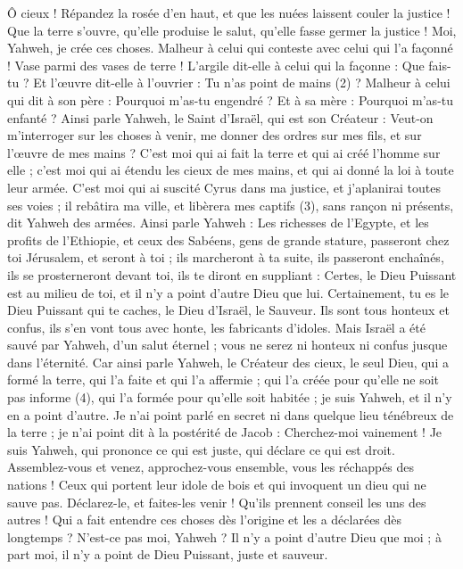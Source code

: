 \begin{multicols}{2}
Ô cieux ! Répandez la rosée d'en haut, et que les nuées laissent couler la justice ! Que la terre s'ouvre, qu'elle produise le salut, qu’elle fasse germer la justice ! Moi, Yahweh, je crée ces choses.
Malheur à celui qui conteste avec celui qui l’a façonné ! Vase parmi des vases de terre ! L'argile dit-elle à celui qui la façonne : Que fais-tu ? Et l’œuvre dit-elle à l’ouvrier : Tu n'as point de mains (2) ?
Malheur à celui qui dit à son père : Pourquoi m’as-tu engendré ? Et à sa mère : Pourquoi m’as-tu enfanté ?
Ainsi parle Yahweh, le Saint d'Israël, qui est son Créateur : Veut-on m’interroger sur les choses à venir, me donner des ordres sur mes fils, et sur l’œuvre de mes mains ?
C'est moi qui ai fait la terre et qui ai créé l'homme sur elle ; c'est moi qui ai étendu les cieux de mes mains, et qui ai donné la loi à toute leur armée.
C'est moi qui ai suscité Cyrus dans ma justice, et j’aplanirai toutes ses voies ; il rebâtira ma ville, et libèrera mes captifs (3), sans rançon ni présents, dit Yahweh des armées.
Ainsi parle Yahweh : Les richesses de l'Egypte, et les profits de l’Ethiopie, et ceux des Sabéens, gens de grande stature, passeront chez toi Jérusalem, et seront à toi ; ils marcheront à ta suite, ils passeront enchaînés, ils se prosterneront devant toi, ils te diront en suppliant : Certes, le Dieu Puissant est au milieu de toi, et il n'y a point d'autre Dieu que lui.
Certainement, tu es le Dieu Puissant qui te caches, le Dieu d'Israël, le Sauveur.
Ils sont tous honteux et confus, ils s’en vont tous avec honte, les fabricants d’idoles.
Mais Israël a été sauvé par Yahweh, d'un salut éternel ; vous ne serez ni honteux ni confus jusque dans l’éternité.
Car ainsi parle Yahweh, le Créateur des cieux, le seul Dieu, qui a formé la terre, qui l'a faite et qui l'a affermie ; qui l’a créée pour qu’elle ne soit pas informe (4), qui l’a formée pour qu’elle soit habitée ; je suis Yahweh, et il n'y en a point d'autre.
Je n'ai point parlé en secret ni dans quelque lieu ténébreux de la terre ; je n'ai point dit à la postérité de Jacob : Cherchez-moi vainement ! Je suis Yahweh, qui prononce ce qui est juste, qui déclare ce qui est droit.
Assemblez-vous et venez, approchez-vous ensemble, vous les réchappés des nations ! Ceux qui portent leur idole de bois et qui invoquent un dieu qui ne sauve pas.
Déclarez-le, et faites-les venir ! Qu’ils prennent conseil les uns des autres ! Qui a fait entendre ces choses dès l’origine et les a déclarées dès longtemps ? N’est-ce pas moi, Yahweh ? Il n'y a point d'autre Dieu que moi ; à part moi, il n'y a point de Dieu Puissant, juste et sauveur.

\end{multicols}
